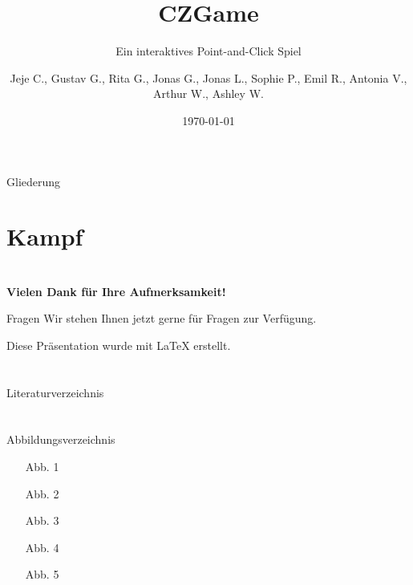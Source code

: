 \documentclass{beamer} [10.12.2024]
\title{CZGame}
\subtitle{Ein interaktives Point-and-Click Spiel}
\author{Jeje C., Gustav G., Rita G., Jonas G., Jonas L., Sophie P., Emil R., Antonia V., Arthur W., Ashley W.}
\institute[CZG]{Carl-Zeiss-Gymnasium Jena}
\date{\today}
\begin{document}
	
	\begin{frame}
		\titlepage
	\end{frame}
	
	\begin{frame}{Gliederung}
		\tableofcontents[pausesections]
	\end{frame}
	
	\section{Kampf}
	
	
	
	\section*{}
	
	\begin{frame}
		\begin{center}
			\Large\textbf{Vielen Dank für Ihre Aufmerksamkeit!}
		\end{center}
		
		\vspace{0,5cm}
		
		\begin{block}{Fragen}
			Wir stehen Ihnen jetzt gerne für Fragen zur Verfügung.
		\end{block}
		
		\vspace{1cm}
		
		\begin{flushright}
			\footnotesize{Diese Präsentation wurde mit \LaTeX{} erstellt.}
		\end{flushright}
	\end{frame}
	
	
	\section*{}
	\begin{frame}[allowframebreaks]{Literaturverzeichnis} 
	\end{frame}
	
	\section*{}
	\begin{frame}[allowframebreaks]{Abbildungsverzeichnis} 
		\begin{itemize}
			\item[Abb. 1] 
			\item[Abb. 2] 
			\item[Abb. 3] 
			\item[Abb. 4] 
			\item[Abb. 5] 
		\end{itemize}
	\end{frame}
	
\end{document}
